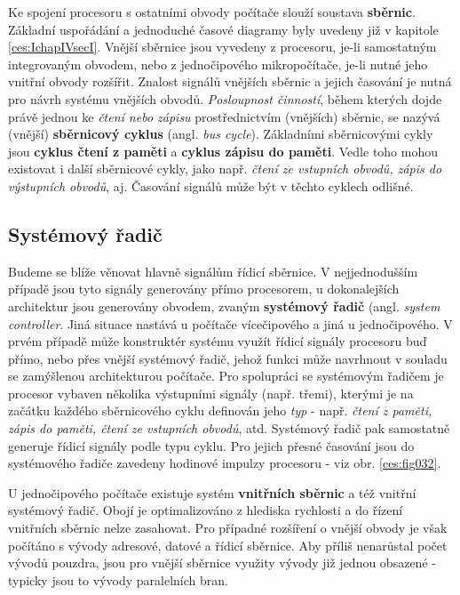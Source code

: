     Ke spojení procesoru s ostatními obvody počítače slouží soustava \textbf{sběrnic}. Základní 
    uspořádání a jednoduché časové diagramy byly uvedeny již v kapitole \ref{ces:IchapIVsecI}. 
    Vnější sběrnice jsou vyvedeny z procesoru, je-li samostatným integrovaným obvodem, nebo z 
    jednočipového mikropočítače, je-li nutné jeho vnitřní obvody rozšířit. Znalost signálů vnějších 
    sběrnic a jejich časování je nutná pro návrh systému vnějších obvodů. \emph{Posloupnost 
    činností}, během kterých dojde právě jednou ke \emph{čtení nebo zápisu} prostřednictvím 
    (vnějších) sběrnic, se nazývá (vnější) \textbf{sběrnicový cyklus} (angl. \emph{bus cycle}). 
    Základními sběrnicovými cykly jsou \textbf{cyklus čtení z paměti} a \textbf{cyklus 
    zápisu do paměti}. Vedle toho mohou existovat i další sběrnicové cykly, jako např. \emph{čtení 
    ze vstupních obvodů, zápis do výstupních obvodů}, aj. Časování signálů může být v těchto 
    cyklech odlišné.
    
    \subsection{Systémový řadič}
      Budeme se blíže věnovat hlavně signálům řídicí sběrnice. V nejjednodušším případě jsou tyto
      signály generovány přímo procesorem, u dokonalejších architektur jsou generovány obvodem,
      zvaným \textbf{systémový řadič} (angl. \emph{system controller}. Jiná situace nastává u
      počítače vícečipového a jiná u jednočipového. V prvém případě může konstruktér systému využít
      řídicí signály procesoru buď přímo, nebo přes vnější systémový řadič, jehož funkci může
      navrhnout v souladu se zamýšlenou architekturou počítače. Pro spolupráci se systémovým řadičem
      je procesor vybaven několika výstupními signály (např. třemi), kterými je na začátku každého
      sběrnicového cyklu definován jeho \emph{typ} - např. \emph{čtení z paměti, zápis do paměti,
      čtení ze vstupních obvodů}, atd. Systémový řadič pak samostatně generuje řídicí signály podle
      typu cyklu. Pro jejich přesné časování jsou do systémového řadiče zavedeny hodinové impulzy
      procesoru - viz obr. \ref{ces:fig032}.
      
      
      U jednočipového počítače existuje systém \textbf{vnitřních sběrnic} a též vnitřní systémový 
      řadič. Obojí je optimalizováno z hlediska rychlosti a do řízení vnitřních sběrnic nelze 
      zasahovat. Pro případné rozšíření o vnější obvody je však počítáno s vývody adresové, datové 
      a řídicí sběrnice. Aby příliš nenarůstal počet vývodů pouzdra, jsou pro vnější sběrnice 
      využity vývody již jednou obsazené - typicky jsou to vývody paralelních bran.
      
